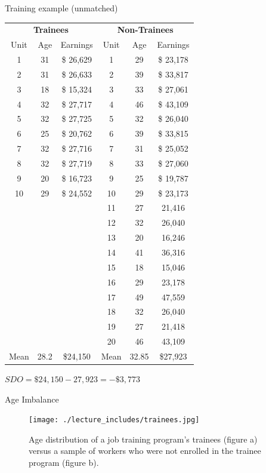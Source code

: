 \documentclass{beamer}
\begin{document}
\begin{frame}{Training example (unmatched)}

\begin{table}[htb]\tiny{}
\centering
\tiny
\begin{tabular}{ccc|ccc}
\toprule
	\multicolumn{3}{c}{\textbf{Trainees}}&
	\multicolumn{3}{c}{\textbf{Non-Trainees}}\\
	\multicolumn{1}{c}{Unit}&
	\multicolumn{1}{c}{Age}&
	\multicolumn{1}{c}{Earnings}&
	\multicolumn{1}{c}{Unit}&
	\multicolumn{1}{c}{Age}&
	\multicolumn{1}{c}{Earnings}\\
\midrule
1 & 	31 & \$	26,629 & 	1 & 	29 & \$	23,178 \\
2 & 	31 & \$	26,633 & 	2 & 	39 &\$ 	33,817 \\
3 & 	18 & 	\$	15,324 & 	3 & 	33 & \$	27,061 \\
4 & 	32 &\$ 	27,717 & 	4 & 	46 & \$	43,109 \\
5 & 	32 & \$	27,725 & 	5 & 	32 & \$	26,040 \\
6 & 	25 & \$	20,762 & 	6 & 	39 & \$	33,815 \\
7 & 	32 &\$ 	27,716 & 	7 & 	31 & \$	25,052 \\
8 & 	32 & \$	27,719 & 	8 & 	33 & \$	27,060 \\
9 & 	20 & \$	16,723 & 	9 & 	25 &\$ 	19,787 \\
10 & 	29 & \$	24,552 & 	10 & 	29 &\$ 	23,173 \\
&&&			11 & 	27 & 	21,416 \\
&&&			12 & 	32 & 	26,040 \\
&&&			13 & 	20 & 	16,246 \\
&&&			14 & 	41 & 	36,316 \\
&&&			15 & 	18 & 	15,046 \\
&&&			16 & 	29 & 	23,178 \\
&&&			17 & 	49 & 	47,559 \\
&&&			18 & 	32 & 	26,040 \\
&&&			19 & 	27 & 	21,418 \\
&&&			20 & 	46 & 	43,109 \\
\midrule
Mean & 	28.2 & 	\$24,150 & 	Mean & 	32.85 & 	\$27,923 \\
\bottomrule
\end{tabular}
\end{table}
\tiny
$SDO = \$24,150-27,923 = -\$3,773$


\end{frame}


\begin{frame}{Age Imbalance}

\begin{figure}[!t]\centering
\caption{Age distribution of a job training program's trainees (figure a) versus a sample of workers who were not enrolled in the trainee program (figure b).}
\texttt{[image: ./lecture\_includes/trainees.jpg]}
\end{figure}

\end{frame}
\end{document}
